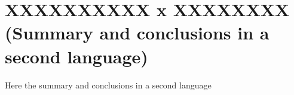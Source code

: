 %
%

\chapter{XXXXXXXXXX x XXXXXXXX (Summary and conclusions in a second language)}

\noindent Here the summary and conclusions in a second language

